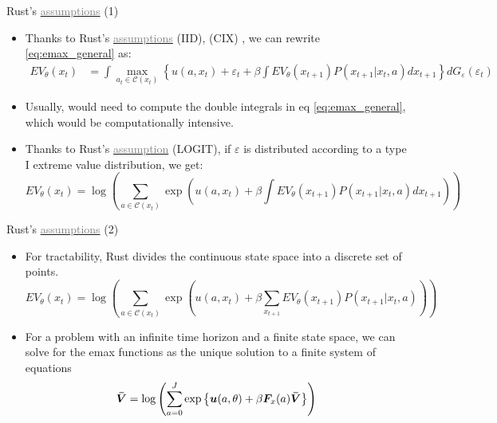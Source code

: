 \documentclass[aspectratio=169]{beamer}
\begin{document}
	\begin{frame}{ Rust's \hyperlink{subsec:rust_assumptions}{\textcolor{gray}{assumptions}} (1)}
		\begin{itemize}[<+->]
			\itemsep1em
			\item Thanks to Rust's \hyperlink{subsec:rust_assumptions}{\textcolor{gray}{assumptions}} (IID), (CIX) , we can rewrite \ref{eq:emax_general} as:
			\begin{align}
				EV_\theta(x_t) &= \int \max_{a_t \in \mathcal{C}(x_t)} \left\{ u(a,x_{t}) + \varepsilon_t + \beta \int EV_\theta(x_{t+1})P(x_{t+1}|x_t,a) dx_{t+1} \right\} dG_\varepsilon(\varepsilon_t) \label{eq:emax_rust}
			\end{align}
			\item Usually, would need to compute the double integrals in eq \ref{eq:emax_general}, which would be computationally intensive.
			\item Thanks to Rust's \hyperlink{subsec:rust_assumptions}{\textcolor{gray}{assumption}} (LOGIT), if $\varepsilon$ is distributed according to a type I extreme value distribution, we get:
			\begin{equation}
				EV_\theta(x_t) = \log \left( \sum_{a \in \mathcal{C}(x_t)} \exp \left( u(a,x_t) + \beta  \int EV_\theta(x_{t+1})P(x_{t+1}|x_t,a) dx_{t+1}  \right) \right)
			\end{equation}
		\end{itemize}
	\end{frame}
	
	\begin{frame}{ Rust's \hyperlink{subsec:rust_assumptions}{\textcolor{gray}{assumptions}} (2)}
		\begin{itemize}
			\itemsep1em
			\item For tractability, Rust divides the continuous state space into a discrete set of points.
			\begin{equation} \label{eq:emaxfunc_logit}
				EV_\theta(x_t) = \log \left( \sum_{a \in \mathcal{C}(x_t)} \exp \left( u(a,x_t) + \beta  \sum_{x_{t+1}} EV_\theta(x_{t+1})P(x_{t+1}|x_t,a) \right) \right)
			\end{equation}
			\item For a problem with an infinite time horizon and a finite state space, we can solve for the emax functions as the unique solution to a finite system of equations
			\begin{equation} \label{eq:valuefunciteration}
				\bm{\Bar{V}} = \log \left(\sum_{a=0}^J \exp \left\{ \bm{u}(a,\theta) + \beta \bm{F}_x(a) \bm{\Bar{V}} \right\} \right)
			\end{equation}
		\end{itemize}
	\end{frame}
	
\end{document}
